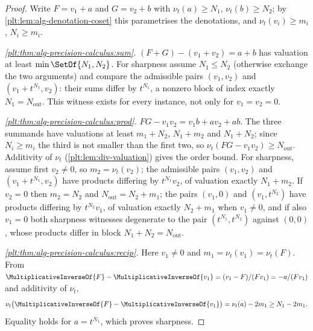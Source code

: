 \documentclass[11pt,oneside]{article}
\theoremstyle{plain}
\theoremstyle{definition}
\theoremstyle{remark}
\newcommand{\ordt}{\nu_{t}}                              %
\begin{document}
\begin{proof}
Write \(F=v_1+a\) and \(G=v_2+b\) with \(\ordt(a)\ge N_1\), \(\ordt(b)\ge N_2\);
by \cref{plt:lem:alg-denotation-coset} this parametrises the denotations, and
\(\ordt(v_i)\ge m_i\), \(N_i\ge m_i\).

\emph{\ref{plt:thm:alg-precision-calculus:sum}.}
\((F+G)-(v_1+v_2)=a+b\) has valuation at least \(\min\SetOf{N_1,N_2}\).
For sharpness assume \(N_1\le N_2\) (otherwise exchange the two arguments) and
compare the admissible pairs \((v_1,v_2)\) and \((v_1+t^{N_1},v_2)\): their
sums differ by \(t^{N_1}\), a nonzero block of index exactly
\(N_1=N_{\mathrm{out}}\).  This witness exists for every instance, not only for
\(v_1=v_2=0\).

\emph{\ref{plt:thm:alg-precision-calculus:prod}.}
\(FG-v_1v_2=v_1b+av_2+ab\).  The three summands have valuations at least
\(m_1+N_2\), \(N_1+m_2\) and \(N_1+N_2\); since \(N_i\ge m_i\) the third is not
smaller than the first two, so \(\ordt(FG-v_1v_2)\ge N_{\mathrm{out}}\).
Additivity of \(\ordt\) (\cref{plt:lem:div-valuation}) gives the order bound.
For sharpness, assume first \(v_2\ne0\), so \(m_2=\ordt(v_2)\); the admissible
pairs \((v_1,v_2)\) and \((v_1+t^{N_1},v_2)\) have products differing by
\(t^{N_1}v_2\), of valuation exactly \(N_1+m_2\).  If \(v_2=0\) then
\(m_2=N_2\) and \(N_{\mathrm{out}}=N_2+m_1\); the pairs \((v_1,0)\) and
\((v_1,t^{N_2})\) have products differing by \(t^{N_2}v_1\), of valuation
exactly \(N_2+m_1\) when \(v_1\neq0\), and if also \(v_1=0\) both sharpness
witnesses degenerate to the pair \((t^{N_1},t^{N_2})\) against \((0,0)\), whose
products differ in block \(N_1+N_2=N_{\mathrm{out}}\).

\emph{\ref{plt:thm:alg-precision-calculus:recip}.}
Here \(v_1\ne0\) and \(m_1=\ordt(v_1)=\ordt(F)\).  From
\(\MultiplicativeInverseOf{F}-\MultiplicativeInverseOf{v_1}
=(v_1-F)/(Fv_1)=-a/(Fv_1)\) and additivity of \(\ordt\),
\[
 \ordt\bigl(\MultiplicativeInverseOf{F}-\MultiplicativeInverseOf{v_1}\bigr)
 =\ordt(a)-2m_1\ge N_1-2m_1 .
\]
Equality holds for \(a=t^{N_1}\), which proves sharpness.


\end{proof}
\end{document}
